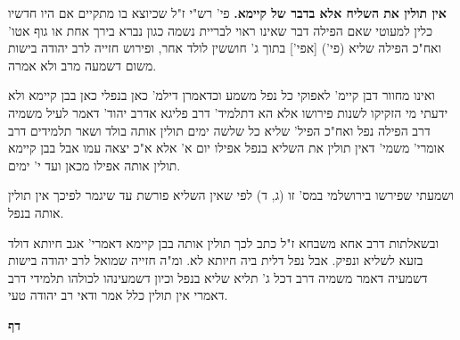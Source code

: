 \documentclass[12pt, openany]{book}
\newcommand{\chapname}{}
\newcommand{\newchap}[1]{
	\addcontentsline{toc}{chapter}{#1}
	\renewcommand{\chapname}{#1}
		\begin{center}
			\textbf{%
\fontsize{16pt}{16pt}\selectfont
				#1}
		\end{center}
}
\begin{document}
{\par\textbf{אין תולין את השליח אלא בדבר של קיימא.}  פי' רש"י ז"ל שכיוצא בו מתקיים אם היו חדשיו כלין למעוטי שאם הפילה דבר שאינו ראוי לבריית נשמה כגון נברא בירך אחת או גוף אטו' ואח"כ הפילה שליא (פי') [אפי'] בתוך ג' חוששין לולד אחר, ופירוש חזייה לרב יהודה בישות משום דשמעה מרב ולא אמרה.\par ואינו מחוור דבן קיימ' לאפוקי כל נפל משמע וכדאמרן דילמ' כאן בנפלי כאן בבן קיימא ולא ידעתי מי הזקיקו לשנות פירושו אלא הא דתלמיד' דרב פליגא אדרב יהוד' דאמר לעיל משמיה דרב הפילה נפל ואח"כ הפיל' שליא כל שלשה ימים תולין אותה בולד ושאר תלמידים דרב אומרי' משמי' דאין תולין את השליא בנפל אפילו יום א' אלא א"כ יצאה עמו אבל בבן קיימא תולין אותה אפילו מכאן ועד י' ימים.\par ושמעתי שפירשו בירושלמי במס' זו (ג, ד) לפי שאין השליא פורשת עד שיגמר לפיכך אין תולין אותה בנפל.\par  ובשאלתות דרב אחא משבחא ז"ל כתב לכך תולין אותה בבן קיימא דאמרי' אגב חיותא דולד בזעא לשליא ונפיק. אבל נפל דלית ביה חיותא לא. ומ"ה חזייה שמואל לרב יהודה בישות דשמעיה דאמר משמיה דרב דכל ג' תליא שליא בנפל וכיון דשמעינהו לכולהו תלמידי דרב דאמרי אין תולין כלל אמר ודאי רב יהודה טעי. 
\par}
\newchap{דף }
\end{document}

